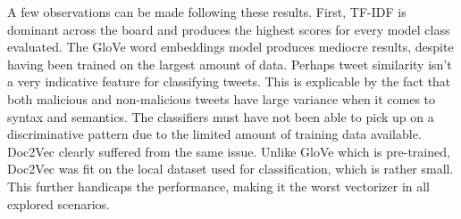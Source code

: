 \documentclass[a4paper,12pt]{article}
\makeatletter
\newcommand{\STAB}[1]{\begin{tabular}{@{}c@{}}#1\end{tabular}}
\makeatother
\begin{document}
\begin{table}[H]
\captionsetup{justification=centering}
\caption{\label{tab:baselineML}Baseline performance scores of machine learning for\\
all combinations of classifier, vectorizer and features.}
\end{table}
A few observations can be made following these results. First, TF-IDF is dominant across the board and produces the highest scores for every model class evaluated. The GloVe word embeddings model produces mediocre results, despite having been trained on the largest amount of data. Perhaps tweet similarity isn't a very indicative feature for classifying tweets. This is explicable by the fact that both malicious and non-malicious tweets have large variance when it comes to syntax and semantics. The classifiers must have not been able to pick up on a discriminative pattern due to the limited amount of training data available. Doc2Vec clearly suffered from the same issue. Unlike GloVe which is pre-trained, Doc2Vec was fit on the local dataset used for classification, which is rather small. This further handicaps the performance, making it the worst vectorizer in all explored scenarios.
\end{document}
